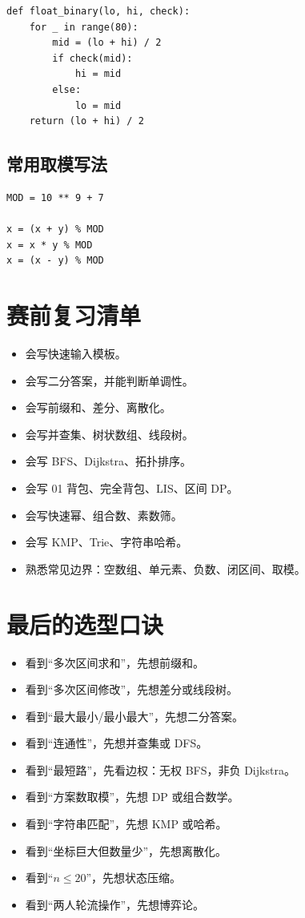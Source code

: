\documentclass[UTF8,a4paper,14pt]{ctexart}
\begin{document}
\begin{lstlisting}
def float_binary(lo, hi, check):
    for _ in range(80):
        mid = (lo + hi) / 2
        if check(mid):
            hi = mid
        else:
            lo = mid
    return (lo + hi) / 2
\end{lstlisting}

\subsection{常用取模写法}

\begin{lstlisting}
MOD = 10 ** 9 + 7

x = (x + y) % MOD
x = x * y % MOD
x = (x - y) % MOD
\end{lstlisting}

\section{赛前复习清单}

\begin{itemize}
  \item 会写快速输入模板。
  \item 会写二分答案，并能判断单调性。
  \item 会写前缀和、差分、离散化。
  \item 会写并查集、树状数组、线段树。
  \item 会写 BFS、Dijkstra、拓扑排序。
  \item 会写 01 背包、完全背包、LIS、区间 DP。
  \item 会写快速幂、组合数、素数筛。
  \item 会写 KMP、Trie、字符串哈希。
  \item 熟悉常见边界：空数组、单元素、负数、闭区间、取模。
\end{itemize}

\section{最后的选型口诀}

\begin{itemize}
  \item 看到“多次区间求和”，先想前缀和。
  \item 看到“多次区间修改”，先想差分或线段树。
  \item 看到“最大最小/最小最大”，先想二分答案。
  \item 看到“连通性”，先想并查集或 DFS。
  \item 看到“最短路”，先看边权：无权 BFS，非负 Dijkstra。
  \item 看到“方案数取模”，先想 DP 或组合数学。
  \item 看到“字符串匹配”，先想 KMP 或哈希。
  \item 看到“坐标巨大但数量少”，先想离散化。
  \item 看到“$n \le 20$”，先想状态压缩。
  \item 看到“两人轮流操作”，先想博弈论。
\end{itemize}
\end{document}
